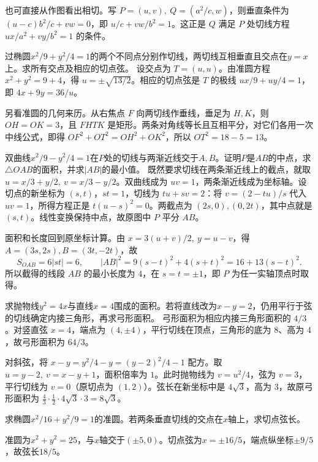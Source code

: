 也可直接从作图看出相切。写 \(P=(u,v),\ Q=(a^2/c,w)\)，则垂直条件为 \((u-c)b^2/c+vw=0\)，即 \(u/c+vw/b^2=1\)。这正是 \(Q\) 满足 \(P\) 处切线方程 \(ux/a^2+vy/b^2=1\) 的条件。


过椭圆\(x^2/9+y^2/4=1\)的两个不同点分别作切线，两切线互相垂直且交点在\(y=x\)上。求所有交点及相应的切点弦。
\solutionanswer
设交点为 \(T=(u,u)\)。由准圆方程 \(x^2+y^2=9+4\)，得 \(u=\pm\sqrt{13/2}\)。相应的切点弦是 \(T\) 的极线 \(ux/9+uy/4=1\)，即 \(4x+9y=36/u\)。

另看准圆的几何来历。从右焦点 \(F\) 向两切线作垂线，垂足为 \(H,K\)，则 \(OH=OK=3\)，且 \(FHTK\) 是矩形。两条对角线等长且互相平分，对它们各用一次中线公式，即得 \(OF^2+OT^2=OH^2+OK^2\)，所以 \(OT^2=18-5=13\)。


双曲线\(x^2/9-y^2/4=1\)在\(P\)处的切线与两渐近线交于\(A,B\)。证明\(P\)是\(AB\)的中点，求\(\triangle OAB\)的面积，并求\(|AB|\)的最小值。
\solutionanswer
既然要求切线在两条渐近线上的截点，就取 \(u=x/3+y/2,\ v=x/3-y/2\)。双曲线成为 \(uv=1\)，两条渐近线成为坐标轴。设切点的新坐标为 \((s,t)\)，\(st=1\)，切线为 \(tu+sv=2\)：将 \(v=(2-tu)/s\) 代入 \(uv=1\)，所得方程正是 \(t(u-s)^2=0\)。两截点为 \((2s,0),(0,2t)\)，其中点就是 \((s,t)\)。线性变换保持中点，故原图中 \(P\) 平分 \(AB\)。

面积和长度回到原坐标计算。由 \(x=3(u+v)/2,\ y=u-v\)，得 \(A=(3s,2s), B=(3t,-2t)\)，故
\[
 S_{OAB}=6|st|=6,\qquad |AB|^2=9(s-t)^2+4(s+t)^2=16+13(s-t)^2.
\]
所以截得的线段 \(AB\) 的最小长度为 \(4\)，在 \(s=t=\pm1\)，即 \(P\) 为任一实轴顶点时取得。


求抛物线\(y^2=4x\)与直线\(x=4\)围成的面积。若将直线改为\(x-y=2\)，仍用平行于弦的切线确定内接三角形，再求弓形面积。
\solutionanswer
弓形面积为相应内接三角形面积的 \(4/3\)。对竖直弦 \(x=4\)，端点为 \((4,\pm4)\)，平行切线在顶点，三角形的底为 \(8\)、高为 \(4\)，故弓形面积为 \(64/3\)。

对斜弦，将 \(x-y=y^2/4-y=(y-2)^2/4-1\) 配方。取 \(u=y-2,\ v=x-y+1\)，面积倍率为 \(1\)。此时抛物线为 \(v=u^2/4\)，弦为 \(v=3\)，平行切线为 \(v=0\)（原切点为 \((1,2)\)）。弦长在新坐标中是 \(4\sqrt3\)，高为 \(3\)，故原弓形面积为 \(\tfrac43\cdot\tfrac12\cdot4\sqrt3\cdot3=8\sqrt3\)。


求椭圆\(x^2/16+y^2/9=1\)的准圆。若两条垂直切线的交点在\(x\)轴上，求切点弦长。
\par
\solutionanswer
准圆为\(x^2+y^2=25\)，与\(x\)轴交于\((\pm5,0)\)。切点弦为\(x=\pm16/5\)，端点纵坐标\(\pm9/5\)，故弦长\(18/5\)。


